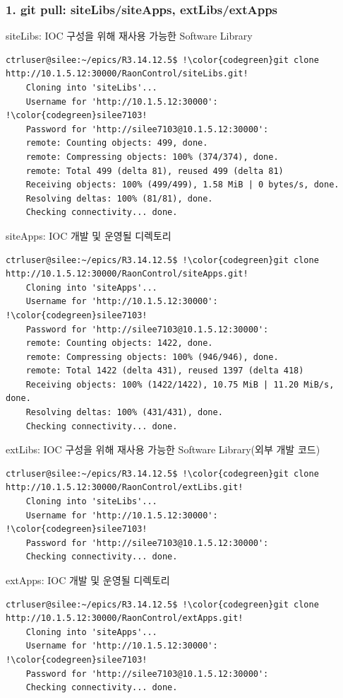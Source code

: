 \documentclass[11pt
  , a4paper
  , article
  , oneside
]{memoir}
\begin{document}
\subsubsection {1. git pull: siteLibs/siteApps, extLibs/extApps}
	siteLibs: IOC 구성을 위해 재사용 가능한 Software Library 
	\begin{lstlisting}[style=termstyle, escapechar=!]	
    ctrluser@silee:~/epics/R3.14.12.5$ !\color{codegreen}git clone http://10.1.5.12:30000/RaonControl/siteLibs.git!
    Cloning into 'siteLibs'...
    Username for 'http://10.1.5.12:30000': !\color{codegreen}silee7103!
    Password for 'http://silee7103@10.1.5.12:30000': 
    remote: Counting objects: 499, done.
    remote: Compressing objects: 100% (374/374), done.
    remote: Total 499 (delta 81), reused 499 (delta 81)
    Receiving objects: 100% (499/499), 1.58 MiB | 0 bytes/s, done.
    Resolving deltas: 100% (81/81), done.
    Checking connectivity... done.
    \end{lstlisting}		
    siteApps: IOC 개발 및 운영될 디렉토리
    \begin{lstlisting}[style=termstyle, escapechar=!]	
    ctrluser@silee:~/epics/R3.14.12.5$ !\color{codegreen}git clone http://10.1.5.12:30000/RaonControl/siteApps.git!
    Cloning into 'siteApps'...
    Username for 'http://10.1.5.12:30000': !\color{codegreen}silee7103!
    Password for 'http://silee7103@10.1.5.12:30000': 
    remote: Counting objects: 1422, done.
    remote: Compressing objects: 100% (946/946), done.
    remote: Total 1422 (delta 431), reused 1397 (delta 418)
    Receiving objects: 100% (1422/1422), 10.75 MiB | 11.20 MiB/s, done.
    Resolving deltas: 100% (431/431), done.
    Checking connectivity... done.
    \end{lstlisting}
    extLibs: IOC 구성을 위해 재사용 가능한 Software Library(외부 개발 코드)
    \begin{lstlisting}[style=termstyle, escapechar=!]	
    ctrluser@silee:~/epics/R3.14.12.5$ !\color{codegreen}git clone http://10.1.5.12:30000/RaonControl/extLibs.git!
    Cloning into 'siteLibs'...
    Username for 'http://10.1.5.12:30000': !\color{codegreen}silee7103!
    Password for 'http://silee7103@10.1.5.12:30000': 
    Checking connectivity... done.
    \end{lstlisting}		
    extApps: IOC 개발 및 운영될 디렉토리
    \begin{lstlisting}[style=termstyle, escapechar=!]	
    ctrluser@silee:~/epics/R3.14.12.5$ !\color{codegreen}git clone http://10.1.5.12:30000/RaonControl/extApps.git!
    Cloning into 'siteApps'...
    Username for 'http://10.1.5.12:30000': !\color{codegreen}silee7103!
    Password for 'http://silee7103@10.1.5.12:30000': 
    Checking connectivity... done.
    \end{lstlisting}
\end{document}

